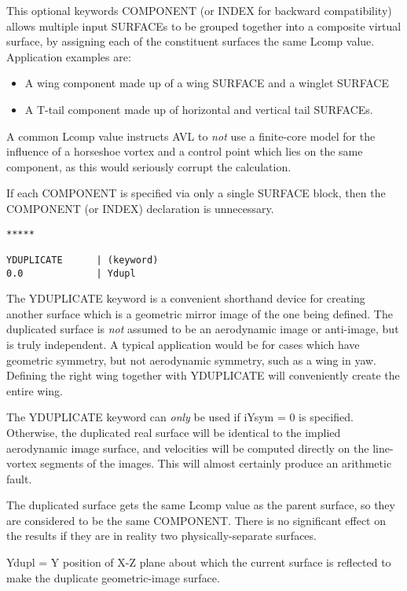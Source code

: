 This optional keywords COMPONENT (or INDEX for backward compatibility)
allows multiple input SURFACEs to be grouped together into a composite 
virtual surface, by assigning each of the constituent surfaces the same 
Lcomp value.  Application examples are:
\begin{itemize}
	\item A wing component made up of a wing SURFACE and a winglet SURFACE
	\item A T-tail component made up of horizontal and vertical tail SURFACEs.
\end{itemize}


A common Lcomp value instructs AVL to \textit{not} use a finite-core model
for the influence of a horseshoe vortex and a control point which lies
on the same component, as this would seriously corrupt the calculation.

If each COMPONENT is specified via only a single SURFACE block,
then the COMPONENT (or INDEX) declaration is unnecessary.\\

\begin{lstlisting}
*****

YDUPLICATE      | (keyword)
0.0             | Ydupl

\end{lstlisting}

The YDUPLICATE keyword is a convenient shorthand device for creating 
another surface which is a geometric mirror image of the one 
being defined.  The duplicated surface is \textit{not} assumed to be 
an aerodynamic image or anti-image, but is truly independent.  
A typical application would be for cases which have geometric 
symmetry, but not aerodynamic symmetry, such as a wing in yaw.  
Defining the right wing together with YDUPLICATE will conveniently 
create the entire wing.

The YDUPLICATE keyword can \textit{only} be used if iYsym = 0 is specified.
Otherwise, the duplicated real surface will be identical to the
implied aerodynamic image surface, and velocities will be computed
directly on the line-vortex segments of the images.  This will 
almost certainly produce an arithmetic fault.

The duplicated surface gets the same Lcomp value as the parent surface,
so they are considered to be the same COMPONENT.  There is no significant 
effect on the results if they are in reality two physically-separate surfaces.


Ydupl =  Y position of X-Z plane about which the current surface is 
reflected to make the duplicate geometric-image surface.\\


